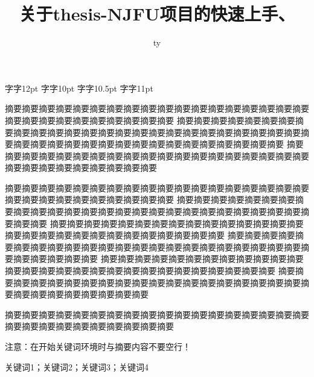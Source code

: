 \documentclass[12pt]{thesis-NJFU}
\title{关于thesis-NJFU项目的快速上手、}
{基本介绍、示例以及测试文档}{A Quick Start and Introduction to thesis-NJFU, 
with Corresponding Demonstrations and Tests}
\author{ty}
\begin{document}
\makecover

\copyrightpage

\begin{cnabstract}
{\normalsize 字}{\fontsize{12pt}{0pt}\selectfont 字12pt}
{\normalsize 字}{\fontsize{10pt}{0pt}\selectfont 字10pt}
{\normalsize 字}{\fontsize{10.5pt}{0pt}\selectfont 字10.5pt}
{\normalsize 字}{\fontsize{11pt}{0pt}\selectfont 字11pt}

摘要摘要摘要摘要摘要摘要摘要摘要摘要摘要摘要摘要摘要摘要摘要摘要摘要摘要摘要摘要摘要摘要摘要摘要摘要摘要摘要摘要
摘要摘要摘要摘要摘要摘要摘要摘要摘要摘要摘要摘要摘要摘要摘要摘要摘要摘要摘要摘要摘要摘要摘要摘要摘要摘要摘要摘要摘要摘要摘要摘要摘要摘要摘要摘要摘要摘要摘要摘要摘要摘要
摘要摘要摘要摘要摘要摘要摘要摘要摘要摘要摘要摘要摘要摘要摘要摘要摘要摘要摘要摘要摘要摘要摘要摘要摘要摘要摘要摘要

摘要摘要摘要摘要摘要摘要摘要摘要摘要摘要摘要摘要摘要摘要摘要摘要摘要摘要摘要摘要摘要摘要摘要摘要摘要摘要摘要摘要
摘要摘要摘要摘要摘要摘要摘要摘要摘要摘要摘要摘要摘要摘要摘要摘要摘要摘要摘要摘要摘要摘要摘要摘要摘要摘要摘要摘要
摘要摘要摘要摘要摘要摘要摘要摘要摘要摘要摘要摘要摘要摘要摘要摘要摘要摘要摘要摘要摘要摘要摘要摘要摘要摘要摘要摘要
摘要摘要摘要摘要摘要摘要摘要摘要摘要摘要摘要摘要摘要摘要摘要摘要摘要摘要摘要摘要摘要摘要摘要摘要摘要摘要摘要摘要
摘要摘要摘要摘要摘要摘要摘要摘要摘要摘要摘要摘要摘要摘要摘要摘要摘要摘要摘要摘要摘要摘要摘要摘要摘要摘要摘要摘要
摘要摘要摘要摘要摘要摘要摘要摘要摘要摘要摘要摘要摘要摘要摘要摘要摘要摘要摘要摘要摘要摘要摘要摘要摘要摘要摘要摘要

摘要摘要摘要摘要摘要摘要摘要摘要摘要摘要摘要摘要摘要摘要摘要摘要摘要摘要摘要摘要摘要摘要摘要摘要摘要摘要摘要摘要

注意：在开始关键词环境时与摘要内容不要空行！
\begin{cnkeywords}
关键词1；关键词2；关键词3；关键词4
\end{cnkeywords}
\end{cnabstract}
\end{document}
